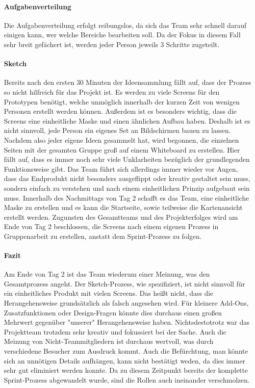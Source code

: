 \paragraph{Aufgabenverteilung}
Die Aufgabenverteilung erfolgt reibungslos, da sich das Team sehr schnell darauf einigen kann, wer welche Bereiche bearbeiten soll. Da der Fokus in diesem Fall sehr breit gefächert ist, werden jeder Person jeweils 3 Schritte zugeteilt.

\paragraph{Sketch}
Bereits nach den ersten 30 Minuten der Ideensammlung fällt auf, dass der Prozess so nicht hilfreich für das Projekt ist. Es werden zu viele Screens für den Prototypen benötigt, welche unmöglich innerhalb der kurzen Zeit von wenigen Personen erstellt werden können. Außerdem ist es besonders wichtig, dass die Screens eine einheitliche Maske und einen ähnlichen Aufbau haben. Deshalb ist es nicht sinnvoll, jede Person ein eigenes Set an Bildschirmen bauen zu lassen. Nachdem also jeder eigene Ideen gesammelt hat, wird begonnen, die einzelnen Seiten mit der gesamten Gruppe groß auf einem Whiteboard zu erstellen. Hier fällt auf, dass es immer noch sehr viele Unklarheiten bezüglich der grundlegenden Funktionsweise gibt. Das Team führt sich allerdings immer wieder vor Augen, dass das Endprodukt nicht besonders ausgeflippt oder kreativ gestaltet sein muss, sondern einfach zu verstehen und nach einem einheitlichen Prinzip aufgebaut sein muss. Innerhalb des Nachmittags von Tag 2 schafft es das Team, eine einheitliche Maske zu erstellen und es kann die Startseite, sowie teilweise die Kartenansicht erstellt werden.
Zugunsten des Gesamtteams und des Projekterfolges wird am Ende von Tag 2 beschlossen, die Screens nach einem eigenen Prozess in Gruppenarbeit zu erstellen, anstatt dem Sprint-Prozess zu folgen.

\paragraph{Fazit}
Am Ende von Tag 2 ist das Team wiederum einer Meinung, was den Gesamtprozess angeht. Der Sketch-Prozess, wie spezifiziert, ist nicht sinnvoll für ein einheitliches Produkt mit vielen Screens. Das heißt nicht, dass die Herangehensweise grundsätzlich als falsch angesehen wird. Für kleinere Add-Ons, Zusatzfunktionen oder Design-Fragen könnte dies durchaus einen großen Mehrwert gegenüber "unserer" Herangehensweise haben. Nichtsdestotrotz war das Projektteam trotzdem sehr kreativ und fokussiert bei der Sache. Auch die Meinung von Nicht-Teammitgliedern ist durchaus wertvoll, was durch verschiedene Besucher zum Ausdruck kommt. Auch die Befürchtung, man könnte sich an unnötigen Details aufhängen, kann nicht bestätigt weden, da dies immer sehr gut eliminiert werden konnte. Da zu diesem Zeitpunkt bereits der komplette Sprint-Prozess abgewandelt wurde, sind die Rollen auch ineinander verschmolzen.

